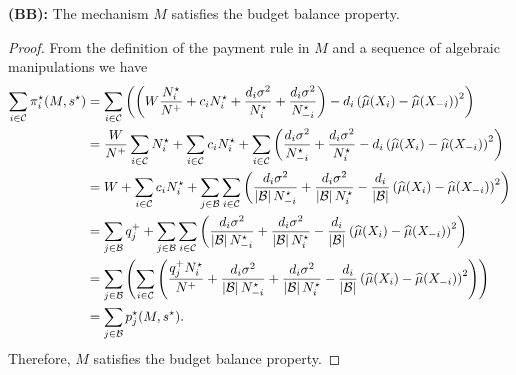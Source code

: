 
\noindent
\textbf{(BB):} The mechanism $M$ satisfies the budget balance property.
\begin{proof}
    From the definition of the payment rule in $M$ and a sequence of algebraic manipulations we have
    \begin{align*}
        \sum_{i\in\mathcal{C}}\pi^\star_i (M, s^{\star})
        &=
        \sum_{i\in\mathcal{C}}
        \left(
            \left(
                W\frac{N^\star_i}{N^{+}}
                +
                c_iN^\star_i
                +
                \frac{d_i\sigma^2}{N^\star_i}
                +
                \frac{d_i\sigma^2}{N^\star_{-i}}
            \right)
            -d_i\left(
                \widehat{\mu}(X_{i})-\widehat{\mu}(X_{-i}) 
            \right)^2
        \right)
        \\
        &=
        \frac{W}{N^{+}} \sum_{i\in\mathcal{C}} N^\star_i
        +
        \sum_{i\in\mathcal{C}} c_iN^\star_i
        +
        \sum_{i\in\mathcal{C}}
        \left(
            \frac{d_i\sigma^2}{N^\star_{-i}}
            +
            \frac{d_i\sigma^2}{N^\star_i}
            -d_i\left(
                \widehat{\mu}(X_{i})-\widehat{\mu}(X_{-i}) 
            \right)^2
        \right)
        \\
        &=
        W 
        +
        \sum_{i\in\mathcal{C}} c_iN^\star_i
        +
        \sum_{j\in\mathcal{B}}\sum_{i\in\mathcal{C}}
        \left(
            \frac{d_i\sigma^2}{\left|\mathcal{B}\right|N^\star_{-i}}
            +
            \frac{d_i\sigma^2}{\left|\mathcal{B}\right|N^\star_i}
            -
            \frac{d_i}{\left|\mathcal{B}\right|}
            \left(
                \widehat{\mu}(X_{i})-\widehat{\mu}(X_{-i}) 
            \right)^2
        \right)
        \\
        &=
        \sum_{j\in\mathcal{B}} q_j^{+}
        +
        \sum_{j\in\mathcal{B}}\sum_{i\in\mathcal{C}}
        \left(
            \frac{d_i\sigma^2}{\left|\mathcal{B}\right|N^\star_{-i}}
            +
            \frac{d_i\sigma^2}{\left|\mathcal{B}\right|N^\star_{i}}
            -
            \frac{d_i}{\left|\mathcal{B}\right|}
            \left(
                \widehat{\mu}(X_{i})-\widehat{\mu}(X_{-i}) 
            \right)^2
        \right)
        \\
        &=
        \sum_{j\in\mathcal{B}}
        \left(
            \sum_{i\in\mathcal{C}}
            \left(
                \frac{q_j^{+} N^\star_i}{N^{+}}
                +
                \frac{d_i\sigma^2}{\left|\mathcal{B}\right|N^\star_{-i}}
                +
                \frac{d_i\sigma^2}{\left|\mathcal{B}\right|N^\star_i}
                -
                \frac{d_i}{\left|\mathcal{B}\right|}
                \left(
                    \widehat{\mu}(X_{i})-\widehat{\mu}(X_{-i}) 
                \right)^2
            \right)
        \right)
        \\
        &=
        \sum_{j\in\mathcal{B}}
        p^\star_j (M, s^{\star}) .
    \end{align*}
    Therefore, $M$ satisfies the budget balance property.
    
\end{proof}
